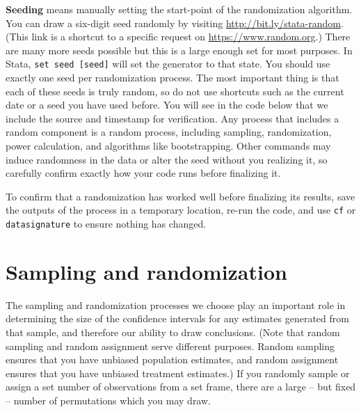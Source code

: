 \textbf{Seeding} means manually setting the start-point of the randomization algorithm.
You can draw a six-digit seed randomly by visiting \url{http://bit.ly/stata-random}.
(This link is a shortcut to a specific request on \url{https://www.random.org}.)
There are many more seeds possible but this is a large enough set for most purposes.
In Stata, \texttt{set seed [seed]} will set the generator to that state.
You should use exactly one seed per randomization process.
The most important thing is that each of these seeds is truly random,
so do not use shortcuts such as the current date or a seed you have used before.
You will see in the code below that we include the source and timestamp for verification.
Any process that includes a random component is a random process,
including sampling, randomization, power calculation, and algorithms like bootstrapping.
Other commands may induce randomness in the data or alter the seed without you realizing it,
so carefully confirm exactly how your code runs before finalizing it.

To confirm that a randomization has worked well before finalizing its results,
save the outputs of the process in a temporary location,
re-run the code, and use \texttt{cf} or \texttt{datasignature} to ensure nothing has changed.


\section{Sampling and randomization}

The sampling and randomization processes we choose
play an important role in determining the size of the confidence intervals
for any estimates generated from that sample,
and therefore our ability to draw conclusions.
(Note that random sampling and random assignment serve different purposes.
Random sampling ensures that you have unbiased population estimates,
and random assignment ensures that you have unbiased treatment estimates.)
If you randomly sample or assign a set number of observations from a set frame,
there are a large -- but fixed -- number of permutations which you may draw.

